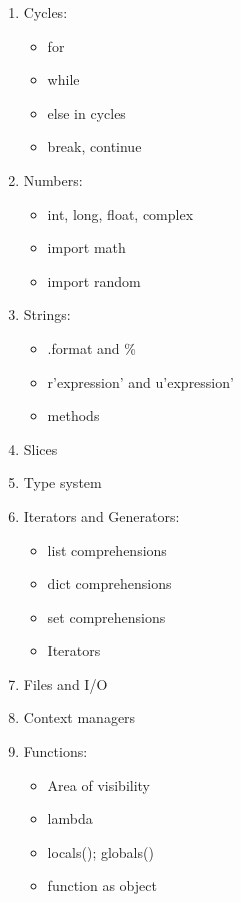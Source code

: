 \documentclass[14pt, a4paper]{article}
\begin{document}
\begin{enumerate}
		\item Cycles:
		\begin{itemize}
			\item for
			\item while
			\item else in cycles
			\item break, continue
		\end{itemize}
		
		\item Numbers:
		\begin{itemize}
			\item int, long, float, complex
			\item import math
			\item import random
		\end{itemize}
		
		\item Strings:
		\begin{itemize}
			\item .format and \%
			\item r'expression' and u'expression'
			\item methods
		\end{itemize}
		
		\item Slices
		
		\item Type system
		
		\item Iterators and Generators:
		\begin{itemize}
			\item list comprehensions
			\item dict comprehensions
			\item set comprehensions
			\item Iterators
		\end{itemize}
		
		\item Files and I/O
		
		\item Context managers
		
		\item Functions:
		\begin{itemize}
			\item Area of visibility
			\item lambda
			\item locals(); globals()
			\item function as object
		\end{itemize}
		

\end{enumerate}
\end{document}
